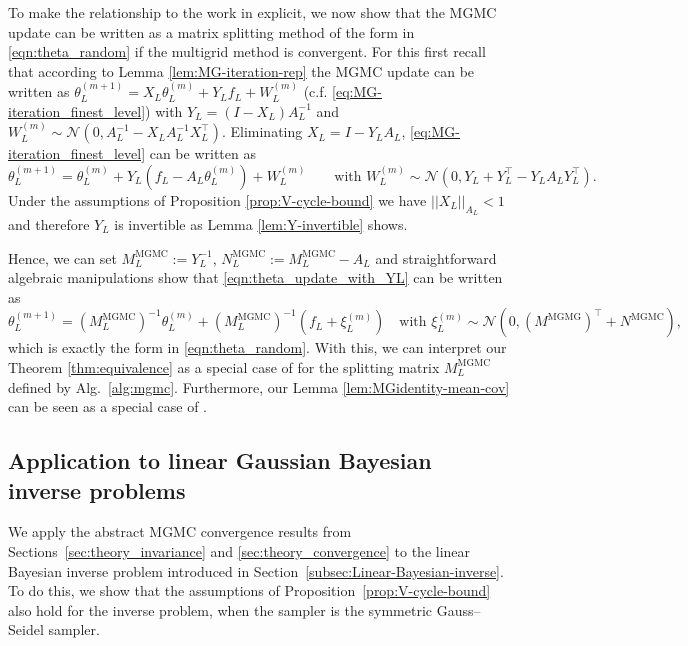 \documentclass[11pt,english]{article}
\theoremstyle{plain}
\theoremstyle{plain}
\theoremstyle{plain}
\theoremstyle{plain}
\numberwithin{equation}{section}
\newcommand*{\id}{I}
\newcommand{\rev}[1]{#1}
\begin{document}
To make the relationship to the work in \cite{Fox.C_Parker_2017_AcceleratedGibbsSampling} explicit, we now show that the MGMC update can be written as a matrix splitting method of the form in \eqref{eqn:theta_random} if the multigrid method is convergent. For this first recall that according to Lemma \ref{lem:MG-iteration-rep} the MGMC update can be written as $\theta_{L}^{(m+1)}= X_{L}\theta_{L}^{(m)}+Y_{L}f_{L}+W^{(m)}_{L}$ (c.f. \eqref{eq:MG-iteration_finest_level}) with $Y_L = (\id-X_L)A_L^{-1}$ and $W_L^{(m)}\sim\mathcal{N}(0,A_L^{-1}-X_LA_L^{-1}X_L^\top)$. Eliminating $X_L = \id - Y_LA_L$, \eqref{eq:MG-iteration_finest_level} can be written as
\begin{equation}
	\theta_L^{(m+1)} = \theta_L^{(m)} + Y_L (f_L-A_L\theta_L^{(m)}) + W_L^{(m)}\qquad\text{with $W_L^{(m)}\sim\mathcal{N}(0,Y_L+Y_L^\top-Y_LA_LY_L^\top)$}.\label{eqn:theta_update_with_YL}
\end{equation}
Under the assumptions of Proposition \ref{prop:V-cycle-bound} we have  $||X_{L}||_{A_{L}}<1$ and therefore $Y_{L}$ is invertible as Lemma \ref{lem:Y-invertible} shows.

Hence, we can set $M_L^{\mathrm{MGMC}}:=Y_L^{-1}$, $N_L^{\mathrm{MGMC}}:=M_L^{\mathrm{MGMC}}-A_L$ and straightforward algebraic manipulations show that \eqref{eqn:theta_update_with_YL} can be written as
\begin{equation}
	\theta_L^{(m+1)} = (M^{\mathrm{MGMC}}_L)^{-1}\theta_L^{(m)} + (M^{\mathrm{MGMC}}_L)^{-1}(f_L+\xi_L^{(m)})\quad\text{with $\xi_L^{(m)}\sim\mathcal{N}(0,(M^{\mathrm{MGMG}})^\top+N^{\mathrm{MGMC}})$},
\end{equation}
which is exactly the form in \eqref{eqn:theta_random}. With this, we can interpret our Theorem \ref{thm:equivalence} as a special case of \cite[Theorem 1]{Fox.C_Parker_2017_AcceleratedGibbsSampling} for the splitting matrix $M_L^{\mathrm{MGMC}}$ defined by Alg.~\ref{alg:mgmc}. Furthermore, our Lemma \ref{lem:MGidentity-mean-cov} can be seen as a special case of \cite[Corollary 3]{Fox.C_Parker_2017_AcceleratedGibbsSampling}.

\subsection{Application to \rev{linear Gaussian Bayesian inverse problems}\label{subsec:Bayesian}}
We apply the abstract MGMC convergence results from Sections~\ref{sec:theory_invariance} and \ref{sec:theory_convergence} to the linear Bayesian inverse problem introduced in Section~\ref{subsec:Linear-Bayesian-inverse}.
To do this, we show that the assumptions of Proposition~\ref{prop:V-cycle-bound} also hold for the inverse problem, when
the sampler is the symmetric Gauss--Seidel sampler.
\end{document}
